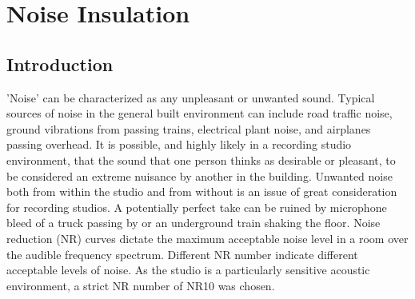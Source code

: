 \documentclass[10pt, twocolumn]{article}
\begin{document}
    \section{Noise Insulation}
        \subsection{Introduction}
            'Noise' can be characterized as any unpleasant or unwanted sound.
            Typical sources of noise in the general built environment can include road traffic noise, ground vibrations from passing trains, electrical plant noise, and airplanes passing overhead.
            It is possible, and highly likely in a recording studio environment, that the sound that one person thinks as desirable or pleasant, to be considered an extreme nuisance by another in the building.
            Unwanted noise both from within the studio and from without is an issue of great consideration for recording studios.
            A potentially perfect take can be ruined by microphone bleed of a truck passing by or an underground train shaking the floor.
            Noise reduction (NR) curves dictate the maximum acceptable noise level in a room over the audible frequency spectrum.
            Different NR number indicate different acceptable levels of noise.
            As the studio is a particularly sensitive acoustic environment, a strict NR number of NR10 was chosen.
            
\end{document}
